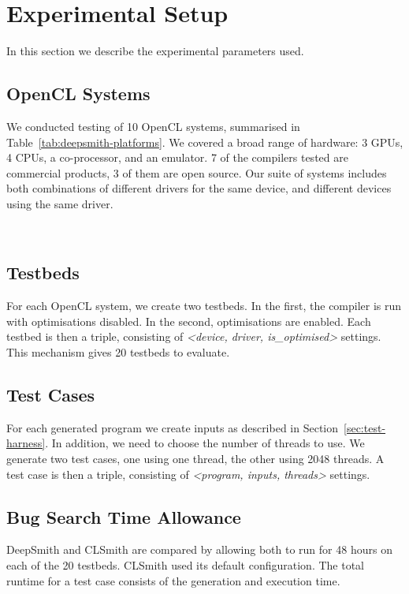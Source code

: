 \section{Experimental Setup}
\label{sec:deepsmith-experimental-setup}

In this section we describe the experimental parameters used.

\subsection{OpenCL Systems}

We conducted testing of 10 OpenCL systems, summarised in
Table~\ref{tab:deepsmith-platforms}. We covered a broad range of hardware: 3 GPUs, 4
CPUs, a co-processor, and an emulator. 7 of the compilers tested are commercial
products, 3 of them are open source. Our suite of systems includes both
combinations of different drivers for the same device, and different devices
using the same driver.

\begin{table}
  \centering %
  \subfloat[][]{}%
  \\%
  \subfloat[][]{} %
  \caption[OpenCL systems and the number of bug reports submitted to date]{%
    OpenCL systems and the number of bug reports submitted to date (22\% of which have been fixed, the remainder are pending). For each system, two testbeds are created, one with compiler optimisations, the other without.%
  }
  \label{tab:deepsmith-platforms}
\end{table}

\subsection{Testbeds}

For each OpenCL system, we create two testbeds. In the first, the compiler is
run with optimisations disabled. In the second, optimisations are enabled. Each
testbed is then a triple, consisting of \emph{<device, driver, is\_optimised>}
settings. This mechanism gives 20 testbeds to evaluate.


\subsection{Test Cases}

For each generated program we create inputs as described in
Section~\ref{sec:test-harness}. In addition, we need to choose the number of
threads to use. We generate two test cases, one using one thread, the other
using 2048 threads. A test case is then a triple, consisting of \emph{<program,
inputs, threads>} settings.

\subsection{Bug Search Time Allowance}

DeepSmith and CLSmith are compared by allowing both to run for 48 hours on
each of the 20 testbeds. CLSmith used its default configuration. The total
runtime for a test case consists of the generation and execution time.
